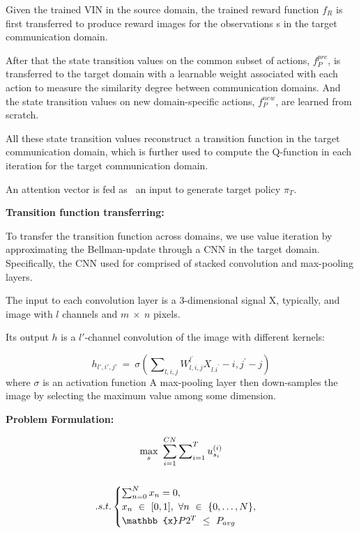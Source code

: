 \documentclass[letterpaper%
, oneside%
, 12pt%
,thesepararticles%
, english%
,creativecommons,hyperref, withAlgo2e%
]{thETS}
\begin{document}
Given the trained VIN in the source domain, the trained reward function $\displaystyle f_{R}$ is first transferred to produce reward images for the observations s in the target communication domain.

After that the state transition values on the common subset of actions, $\displaystyle f_{P}^{pre}$, is transferred to the target domain with a learnable weight associated with each action to measure the similarity degree between communication domains. And the state transition values on new domain-specific actions, $\displaystyle f_{P}^{new}$, are learned from scratch.

All these state transition values reconstruct a transition function in the target communication domain, which is further used to compute the Q-function in each iteration for the target communication domain.

An attention vector is fed as \ an input to generate target policy $\displaystyle \pi _{T}$. 

\textbf{Transition function transferring:}

To transfer the transition function across domains, we use value iteration by approximating the Bellman-update through a CNN in the target domain. Specifically, the CNN used for comprised of stacked convolution and max-pooling layers.


The input to each convolution layer is a 3-dimensional signal X, typically, and image with $\displaystyle l$ channels and $\displaystyle m\ \times \ n$ pixels. 

Its output $\displaystyle h$ is a $\displaystyle l'$-channel convolution of the image with different kernels:

\begin{equation*}
h_{l',i',j'} \ =\ \sigma \left(\sum\nolimits _{l,i,j} W_{l,i,j}^{l^{'}} X_{l.i^{'}} -i,j^{'} -j\right)
\end{equation*}
where $\displaystyle \sigma $ is an activation function A max-pooling layer then down-samples the image by selecting the maximum value among some dimension.

\textbf{Problem Formulation:}

\begin{gather}
\underset{s}{\max} \ \sum _{i=1}^{CN}\sum\nolimits _{i=1}^{T} u_{s_{i}}^{( i)}\\
 \notag\\
.s.t.\begin{cases}
\sum\nolimits _{n=0}^{N} x_{n} =0, & \\
x_{n} \ \in \ [ 0,1] ,\ \forall n\ \in \ \{0,\dotsc ,N\} , & \\
\mathbb{x} P2^{T} \ \leq \ P_{avg} & 
\end{cases} \notag
\end{gather}
\end{document}
